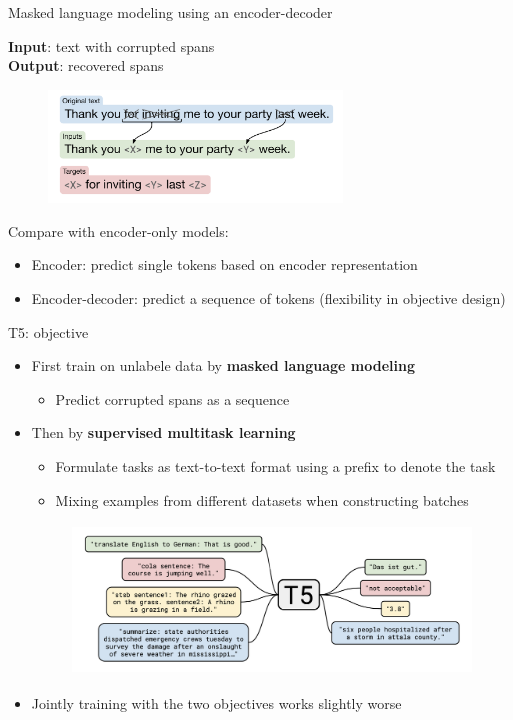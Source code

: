 \documentclass[usenames,dvipsnames,notes,11pt,aspectratio=169,hyperref={colorlinks=true, linkcolor=blue}]{beamer}
\begin{document}
\begin{frame}
    {Masked language modeling using an encoder-decoder}

    \textbf{Input}: text with corrupted spans\\
    \textbf{Output}: recovered spans

    \begin{figure}
        \includegraphics[height=3cm]{figures/t5-span}
    \end{figure}

    Compare with encoder-only models:\\
    \begin{itemize}
        \item Encoder: predict single tokens based on encoder representation
        \item Encoder-decoder: predict a sequence of tokens (flexibility in objective design)
    \end{itemize}
\end{frame}

\begin{frame}
    {T5: objective}

    \begin{itemize}
        \item First train on unlabele data by \textbf{masked language modeling}
            \begin{itemize}
                \item Predict corrupted spans as a sequence
            \end{itemize}
        \item Then  by \textbf{supervised multitask learning}
            \begin{itemize}
                \item Formulate tasks as text-to-text format using a prefix to denote the task
                \item Mixing examples from different datasets when constructing batches  
            \end{itemize}
    \begin{figure}
        \includegraphics[height=4cm]{figures/t5-mtl}
    \end{figure}
        \item Jointly training with the two objectives works slightly worse
    \end{itemize}
\end{frame}
\end{document}

